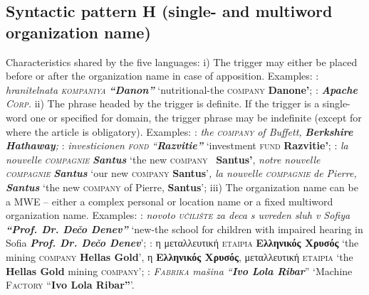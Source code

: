 \documentclass[output=paper]{langsci/langscibook}
\newcommand{\trigger}[1]{\textsc{#1}}
\begin{document}
\subsection{Syntactic pattern H (single- and multiword organization name)}

Characteristics shared by the five languages: i) The trigger may either
be placed before or after the organization name in case of apposition.
Examples: :  \textit{hranitelnata
}\textit{\trigger{kompaniya}}\textit{ }\textbf{\textit{“Danon”}}
‘nutritional-the \trigger{company} \textbf{Danone’}; :
\textbf{\textit{Apache}} \textit{\trigger{Corp.}} ii) The phrase headed
by the trigger is definite. If the trigger is a  single-word one or specified
for domain, the trigger phrase may be indefinite (except for 
where the article is obligatory). Examples: : \textit{the}\trigger{
}\textit{\trigger{company}} \textit{of Buffett,}
\textbf{\textit{Berkshire Hathaway}}\textit{;} :
\textit{investicionen }\textit{\trigger{fond}}\textit{
“}\textbf{\textit{Razvitie”}} ‘investment \trigger{fund}
\textbf{Razvitie’}; : \textit{la nouvelle }\textit{\trigger{compagnie}}
\textbf{\textit{Santus }}‘the new \trigger{company}
\ \textbf{Santus}\textbf{’}, \textit{notre nouvelle
}\textit{\trigger{compagnie}} \textbf{\textit{Santus}} ‘our new
\trigger{company} \textbf{Santus}’\textit{, la nouvelle
}\textit{\trigger{compagnie}} \textit{de Pierre,} \textbf{\textit{Santus
}}‘the new \trigger{company} of Pierre, \textbf{Santus}’; iii) The
organization name can be a 
MWE – either a complex personal or location
name or a fixed multiword organization name. Examples: :
\textit{novoto }\textit{\trigger{učilište}} \textit{za deca s uvreden
sluh v Sofiya }\textbf{\textit{“Prof. Dr. Dečo Denev” }}‘new-the school
for children with impaired hearing in Sofia \textbf{\textit{Prof. Dr.
Dečo Denev}}’; : η μεταλλευτική
\trigger{εταιρία} \textbf{Ελληνικός Χρυσός}
‘the mining \trigger{company} \textbf{Hellas Gold}’, η
\textbf{Ελληνικός Χρυσός}, μεταλλευτική
\trigger{εταιρία} ‘the \textbf{Hellas Gold} mining
\trigger{company}’; : \textit{\trigger{Fabrika}} \textit{mašina
“}\textbf{\textit{Ivo Lola Ribar}}” ‘Machine \trigger{Factory}
“\textbf{Ivo Lola Ribar”}’.
\end{document}
